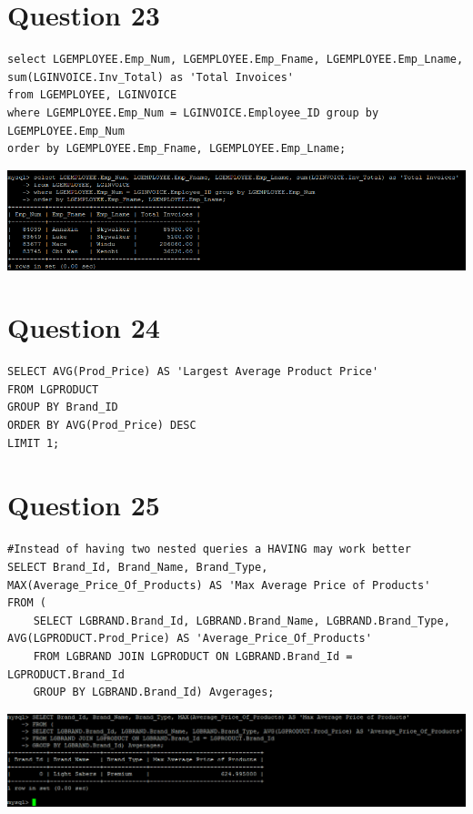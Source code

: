 \documentclass[a4paper,10pt]{article}
\begin{document}
\section*{Question 23}
\lstset{
            language=SQL,
            breaklines=true
            }
        \begin{lstlisting}[frame=single]
        select LGEMPLOYEE.Emp_Num, LGEMPLOYEE.Emp_Fname, LGEMPLOYEE.Emp_Lname, sum(LGINVOICE.Inv_Total) as 'Total Invoices' 
from LGEMPLOYEE, LGINVOICE 
where LGEMPLOYEE.Emp_Num = LGINVOICE.Employee_ID group by LGEMPLOYEE.Emp_Num 
order by LGEMPLOYEE.Emp_Fname, LGEMPLOYEE.Emp_Lname;
        \end{lstlisting}
\includegraphics{Queries/Question_23/Question_23_screenshot.PNG}
\section*{Question 24}
\lstset{
            language=SQL,
            breaklines=true
            }
        \begin{lstlisting}[frame=single]
        SELECT AVG(Prod_Price) AS 'Largest Average Product Price'
FROM LGPRODUCT
GROUP BY Brand_ID
ORDER BY AVG(Prod_Price) DESC
LIMIT 1;
        \end{lstlisting}
\section*{Question 25}
\lstset{
            language=SQL,
            breaklines=true
            }
        \begin{lstlisting}[frame=single]
        #Instead of having two nested queries a HAVING may work better
SELECT Brand_Id, Brand_Name, Brand_Type, MAX(Average_Price_Of_Products) AS 'Max Average Price of Products'
FROM (
	SELECT LGBRAND.Brand_Id, LGBRAND.Brand_Name, LGBRAND.Brand_Type, AVG(LGPRODUCT.Prod_Price) AS 'Average_Price_Of_Products'
	FROM LGBRAND JOIN LGPRODUCT ON LGBRAND.Brand_Id = LGPRODUCT.Brand_Id
	GROUP BY LGBRAND.Brand_Id) Avgerages;

        \end{lstlisting}
\includegraphics{Queries/Question_25/Question_25_screenshot.PNG}
\end{document}
